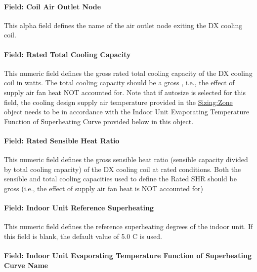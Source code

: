 \paragraph{Field: Coil Air Outlet Node}\label{field-coil-air-outlet-node-1}

This alpha field defines the name of the air outlet node exiting the DX cooling coil.

\paragraph{Field: Rated Total Cooling Capacity}\label{field-rated-total-cooling-capacity}

This numeric field defines the gross rated total cooling capacity of the DX cooling coil in watts. The total cooling capacity should be a gross , i.e., the effect of supply air fan heat NOT accounted for. Note that if autosize is selected for this field, the cooling design supply air temperature provided in the \hyperref[sizingzone]{Sizing:Zone} object needs to be in accordance with the Indoor Unit Evaporating Temperature Function of Superheating Curve provided below in this object.

\paragraph{Field: Rated Sensible Heat Ratio}\label{field-rated-sensible-heat-ratio}

This numeric field defines the gross sensible heat ratio (sensible capacity divided by total cooling capacity) of the DX cooling coil at rated conditions. Both the sensible and total cooling capacities used to define the Rated SHR should be gross (i.e., the effect of supply air fan heat is NOT accounted for)

\paragraph{Field: Indoor Unit Reference Superheating}\label{field-indoor-unit-reference-superheating}

This numeric field defines the reference superheating degrees of the indoor unit. If this field is blank, the default value of 5.0 C is used.

\paragraph{Field: Indoor Unit Evaporating Temperature Function of Superheating Curve Name}\label{field-indoor-unit-evaporating-temperature-function-of-superheating-curve-name}

